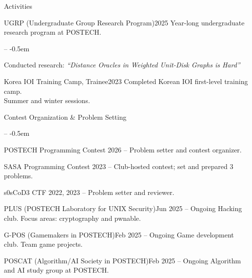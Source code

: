 \documentclass{resume}
\begin{document}
\begin{res-section}{Activities}
  \begin{res-subsection}{UGRP (Undergraduate Group Research Program)}{2025}
    Year-long undergraduate research program at POSTECH.
    \vspace{-0.5em}
    \begin{list}{--}{}
      \itemsep -0.5em
      \item Conducted research: \textit{``Distance Oracles in Weighted Unit-Disk Graphs is Hard''}
    \end{list}
  \end{res-subsection}

  \begin{res-subsection}{Korea IOI Training Camp, Trainee}{2023}
    Completed Korean IOI first-level training camp.\\
    Summer and winter sessions.
  \end{res-subsection}

  \begin{res-subsection}{Contest Organization \& Problem Setting}
    \hfill
    \vspace{0.3em}
    \begin{list}{--}{}
      \itemsep -0.5em
      \item POSTECH Programming Contest 2026 -- Problem setter and contest organizer.
      \item SASA Programming Contest 2023 -- Club-hosted contest; set and prepared 3 problems.
      \item s0sCoD3 CTF 2022, 2023 -- Problem setter and reviewer.
    \end{list}
  \end{res-subsection}

  \begin{res-subsection}{PLUS (POSTECH Laboratory for UNIX Security)}{Jun 2025 -- Ongoing}
    Hacking club. Focus areas: cryptography and pwnable.
  \end{res-subsection}

  \begin{res-subsection}{G-POS (Gamemakers in POSTECH)}{Feb 2025 -- Ongoing}
    Game development club. Team game projects.
  \end{res-subsection}

  \begin{res-subsection}{POSCAT (Algorithm/AI Society in POSTECH)}{Feb 2025 -- Ongoing}
    Algorithm and AI study group at POSTECH.
  \end{res-subsection}
\end{res-section}
\end{document}
